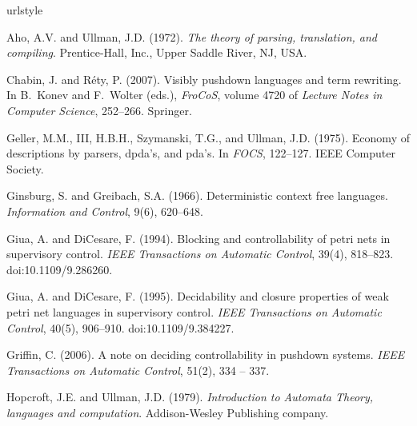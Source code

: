 \documentclass[draft]{ifacconf}
\begin{document}
\begin{thebibliography}{15}
\providecommand{\natexlab}[1]{#1}
\providecommand{\url}[1]{\texttt{#1}}
\providecommand{\urlprefix}{URL }
\expandafter\ifx\csname urlstyle\endcsname\relax
  \providecommand{\doi}[1]{doi:\discretionary{}{}{}#1}\else
  \providecommand{\doi}{doi:\discretionary{}{}{}\begingroup
  \urlstyle{rm}\Url}\fi

Aho, A.V. and Ullman, J.D. (1972).
\newblock \emph{The theory of parsing, translation, and compiling}.
\newblock Prentice-Hall, Inc., Upper Saddle River, NJ, USA.

Chabin, J. and R{\'e}ty, P. (2007).
\newblock Visibly pushdown languages and term rewriting.
\newblock In B.~Konev and F.~Wolter (eds.), \emph{FroCoS}, volume 4720 of
  \emph{Lecture Notes in Computer Science}, 252--266. Springer.

Geller, M.M., III, H.B.H., Szymanski, T.G., and Ullman, J.D. (1975).
\newblock Economy of descriptions by parsers, dpda's, and pda's.
\newblock In \emph{FOCS}, 122--127. IEEE Computer Society.

Ginsburg, S. and Greibach, S.A. (1966).
\newblock Deterministic context free languages.
\newblock \emph{Information and Control}, 9(6), 620--648.

Giua, A. and DiCesare, F. (1994).
\newblock Blocking and controllability of petri nets in supervisory control.
\newblock \emph{IEEE Transactions on Automatic Control}, 39(4), 818--823.
\newblock \doi{10.1109/9.286260}.

Giua, A. and DiCesare, F. (1995).
\newblock Decidability and closure properties of weak petri net languages in
  supervisory control.
\newblock \emph{IEEE Transactions on Automatic Control}, 40(5), 906--910.
\newblock \doi{10.1109/9.384227}.

Griffin, C. (2006).
\newblock A note on deciding controllability in pushdown systems.
\newblock \emph{IEEE Transactions on Automatic Control}, 51(2), 334 -- 337.

Hopcroft, J.E. and Ullman, J.D. (1979).
\newblock \emph{Introduction to Automata Theory, languages and computation}.
\newblock Addison-Wesley Publishing company.


\end{thebibliography}
\end{document}
